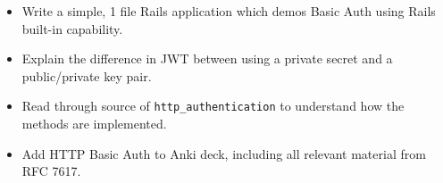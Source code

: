 \documentclass{article}
\begin{document}
\begin{itemize}
  \item Write a simple, 1 file Rails application which demos Basic Auth
    using Rails built-in capability.
  \item Explain the difference in JWT between using a private secret and a
    public/private key pair.
  \item Read through source of \texttt{http\_authentication} to understand how
    the methods are implemented.
  \item Add HTTP Basic Auth to Anki deck, including all relevant material from
    RFC 7617.
\end{itemize}
\end{document}
